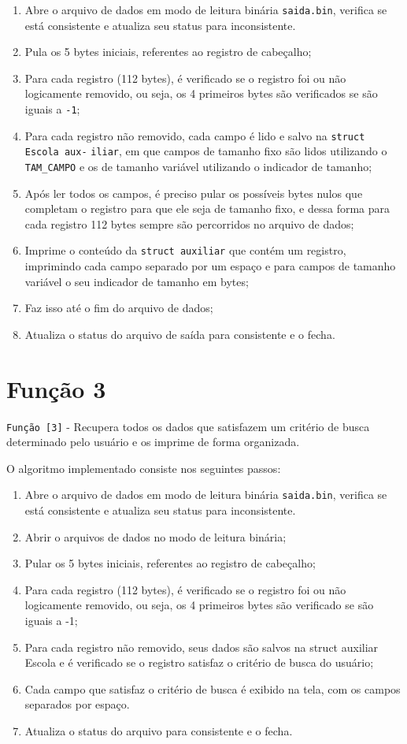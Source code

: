 \documentclass[
	12pt,				%
	openany,			%
	twoside,			%
	a4paper,			%
	english,			%
	french,				%
	spanish,			%
	brazil,				%
	]{abntex2}
\begin{document}
\begin{enumerate}
    \item Abre o arquivo de dados em modo de leitura binária \verb|saida.bin|, verifica se está consistente e atualiza seu status para inconsistente.
    \item Pula os 5 bytes iniciais, referentes ao registro de cabeçalho;
    \item Para cada registro (112 bytes), é verificado se o registro foi ou não logicamente removido, ou seja, os 4 primeiros bytes são verificados se são iguais a \verb|-1|;
    \item Para cada registro não removido, cada campo é lido e salvo na \verb|struct Escola aux-| \verb|iliar|, em que campos de tamanho fixo são lidos utilizando o \verb|TAM_CAMPO| e os de tamanho variável utilizando o indicador de tamanho;
    \item Após ler todos os campos, é preciso pular os possíveis bytes nulos que completam o registro para que ele seja de tamanho fixo, e dessa forma para cada registro 112 bytes sempre são percorridos no arquivo de dados;
    \item Imprime o conteúdo da \verb|struct auxiliar| que contém um registro, imprimindo cada campo separado por um espaço e para campos de tamanho variável o seu indicador de tamanho em bytes;
    \item Faz isso até o fim do arquivo de dados;
    \item Atualiza o status do arquivo de saída para consistente e o fecha.
\end{enumerate}

\section{Função 3}
\verb|Função [3]| - Recupera todos os dados que satisfazem um critério de busca determinado pelo usuário e os imprime de forma organizada.

O algoritmo implementado consiste nos seguintes passos:

\begin{enumerate}
    \item Abre o arquivo de dados em modo de leitura binária \verb|saida.bin|, verifica se está consistente e atualiza seu status para inconsistente.
    \item Abrir o arquivos de dados no modo de leitura binária;
    \item Pular os 5 bytes iniciais, referentes ao registro de cabeçalho;
    \item Para cada registro (112 bytes), é verificado se o registro foi ou não logicamente removido, ou seja, os 4 primeiros bytes são verificado se são iguais a -1;
    \item Para cada registro não removido, seus dados são salvos na struct auxiliar Escola e é verificado se o registro satisfaz o critério de busca do usuário;
    \item  Cada campo que satisfaz o critério de busca é exibido na tela, com os campos separados por espaço.
    \item Atualiza o status do arquivo para consistente e o fecha.
\end{enumerate}
\end{document}
